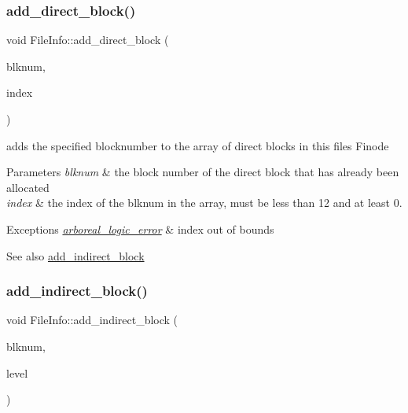 \subsubsection{\texorpdfstring{add\+\_\+direct\+\_\+block()}{add\_direct\_block()}}
{\footnotesize\ttfamily void File\+Info\+::add\+\_\+direct\+\_\+block (\begin{DoxyParamCaption}\item[{Blk\+Num\+Type}]{blknum,  }\item[{int}]{index }\end{DoxyParamCaption})}

adds the specified blocknumber to the array of direct blocks in this file\textquotesingle{}s Finode 
\begin{DoxyParams}{Parameters}
{\em blknum} & the block number of the direct block that has already been allocated \\
\hline
{\em index} & the index of the blknum in the array, must be less than 12 and at least 0. \\
\hline
\end{DoxyParams}

\begin{DoxyExceptions}{Exceptions}
{\em \mbox{\hyperlink{classarboreal__logic__error}{arboreal\+\_\+logic\+\_\+error}}} & index out of bounds \\
\hline
\end{DoxyExceptions}
\begin{DoxySeeAlso}{See also}
\mbox{\hyperlink{class_file_info_a074956f43b5a6900205a541dbeaeb8c5}{add\+\_\+indirect\+\_\+block}} 
\end{DoxySeeAlso}
\mbox{\label{class_file_info_a074956f43b5a6900205a541dbeaeb8c5}} 
\subsubsection{\texorpdfstring{add\+\_\+indirect\+\_\+block()}{add\_indirect\_block()}}
{\footnotesize\ttfamily void File\+Info\+::add\+\_\+indirect\+\_\+block (\begin{DoxyParamCaption}\item[{Blk\+Num\+Type}]{blknum,  }\item[{short}]{level }\end{DoxyParamCaption})}


